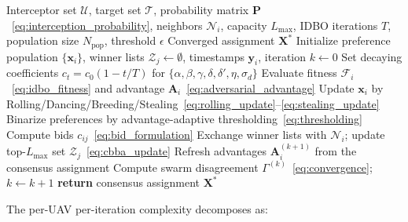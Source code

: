 \documentclass[lettersize,journal]{IEEEtran}
\begin{document}
\begin{algorithm}[!t]
\color{blue}
\caption{Distributed Consensus-Based IDBO for Cooperative Target Assignment (per interceptor $u_i$)}
\label{alg:idbo}
\begin{algorithmic}[1]
\REQUIRE Interceptor set $\mathcal{U}$, target set $\mathcal{T}$, probability matrix $\mathbf{P}$~\eqref{eq:interception_probability}, neighbors $\mathcal{N}_i$, capacity $L_{\max}$, IDBO iterations $T$, population size $N_{\mathrm{pop}}$, threshold $\epsilon$
\ENSURE Converged assignment $\mathbf{X}^\ast$
\STATE Initialize preference population $\{\mathbf{x}_i\}$, winner lists $\mathcal{Z}_j\!\leftarrow\!\emptyset$, timestamps $\mathbf{y}_i$, iteration $k\!\leftarrow\!0$
\REPEAT
    \STATE Set decaying coefficients $c_t=c_0(1-t/T)$ for $\{\alpha,\beta,\gamma,\delta,\delta',\eta,\sigma_d\}$
    \STATE Evaluate fitness $\mathcal{F}_i$~\eqref{eq:idbo_fitness} and advantage $\mathbf{A}_i$~\eqref{eq:adversarial_advantage}
    \STATE Update $\mathbf{x}_i$ by Rolling/Dancing/Breeding/Stealing~\eqref{eq:rolling_update}--\eqref{eq:stealing_update}
  \ENDFOR
  \STATE Binarize preferences by advantage-adaptive thresholding~\eqref{eq:thresholding}
  \STATE Compute bids $c_{ij}$~\eqref{eq:bid_formulation}
  \STATE Exchange winner lists with $\mathcal{N}_i$; update top-$L_{\max}$ set $\mathcal{Z}_j$~\eqref{eq:cbba_update}
  \STATE Refresh advantages $\mathbf{A}_i^{(k+1)}$ from the consensus assignment
  \STATE Compute swarm disagreement $\Gamma^{(k)}$~\eqref{eq:convergence};\; $k\!\leftarrow\!k+1$
\STATE \textbf{return} consensus assignment $\mathbf{X}^\ast$
\end{algorithmic}
\end{algorithm}

The per-UAV per-iteration complexity decomposes as:
\end{document}
